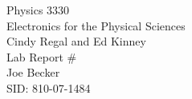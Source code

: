 \begin{titlepage}
\setlength{\topmargin}{1.5in}
\begin{center}
\Huge{Physics 3330} \\
\LARGE{Electronics for the Physical Sciences} \\
\Large{Cindy Regal and Ed Kinney} \\[1cm]

\huge{Lab Report \#\HWnum}\\[0.5cm]

\large{Joe Becker} \\
\large{SID: 810-07-1484} \\
\large{\due} 

\end{center}

\end{titlepage}

